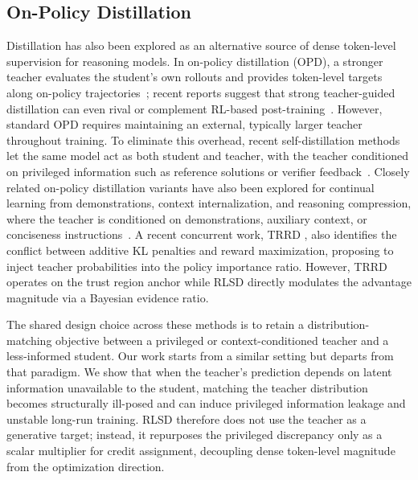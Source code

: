 \subsection{On-Policy Distillation}
Distillation has also been explored as an alternative source of dense token-level supervision for reasoning models. In on-policy distillation (OPD), a stronger teacher evaluates the student's own rollouts and provides token-level targets along on-policy trajectories~\citep{agarwal2024gkd,lu2025onpolicy,fu2026revisitingonpolicydistillationempirical}; recent reports suggest that strong teacher-guided distillation can even rival or complement RL-based post-training~\citep{mimo2025flash}. However, standard OPD requires maintaining an external, typically larger teacher throughout training. To eliminate this overhead, recent self-distillation methods let the same model act as both student and teacher, with the teacher conditioned on privileged information such as reference solutions or verifier feedback~\citep{zhao2026opsd,hbotter2026reinforcementlearningselfdistillation_sdpo}. Closely related on-policy distillation variants have also been explored for continual learning from demonstrations, context internalization, and reasoning compression, where the teacher is conditioned on demonstrations, auxiliary context, or conciseness instructions~\citep{shenfeld2026selfdistillation,ye2026policy,sang2026policy,penaloza2026privileged}. A recent concurrent work, TRRD \citep{zhang2026reinforcementawareknowledgedistillationllm}, also identifies the conflict between additive KL penalties and reward maximization, proposing to inject teacher probabilities into the policy importance ratio. However, TRRD operates on the trust region anchor while RLSD directly modulates the advantage magnitude via a Bayesian evidence ratio.

The shared design choice across these methods is to retain a distribution-matching objective between a privileged or context-conditioned teacher and a less-informed student. Our work starts from a similar setting but departs from that paradigm. We show that when the teacher's prediction depends on latent information unavailable to the student, matching the teacher distribution becomes structurally ill-posed and can induce privileged information leakage and unstable long-run training. RLSD therefore does not use the teacher as a generative target; instead, it repurposes the privileged discrepancy only as a scalar multiplier for credit assignment, decoupling dense token-level magnitude from the optimization direction. 
